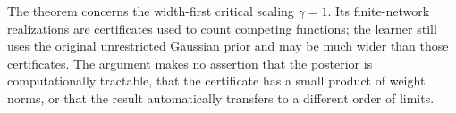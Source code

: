 The theorem concerns the width-first critical scaling $\gamma=1$.
Its finite-network realizations are certificates used to count competing
functions; the learner still uses the original unrestricted Gaussian
prior and may be much wider than those certificates. The argument
makes no assertion that the posterior is computationally tractable,
that the certificate has a small product of weight norms, or that the
result automatically transfers to a different order of limits.

